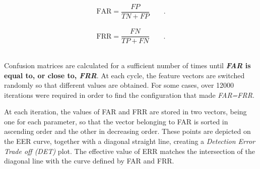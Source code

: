 \\
\begin{equation}
\text{FAR}=\dfrac{FP}{TN+FP} \qquad.
\label{eq:FAR}
\end{equation}
\\
\begin{equation}
\text{FRR}=\dfrac{FN}{TP+FN} \qquad.
\label{eq:FRR}
\end{equation}
\\
\par Confusion matrices are calculated for a sufficient number of times until \textbf{\textit{FAR} is equal to, or close to, \textit{FRR}}. At each cycle, the feature vectors are switched randomly so that different values are obtained. For some cases, over 12000 iterations were required in order to find the configuration that made \textit{FAR=FRR}. 
\\
\par At each iteration, the values of FAR and FRR are stored in two vectors, being one for each parameter, so that the vector belonging to FAR is sorted in ascending order and the other in decreasing order. These points are depicted on the EER curve, together with a diagonal straight line, creating a \textit{Detection Error Trade off (DET)} plot. The effective value of ERR matches the intersection of the diagonal line with the curve defined by FAR and FRR.

